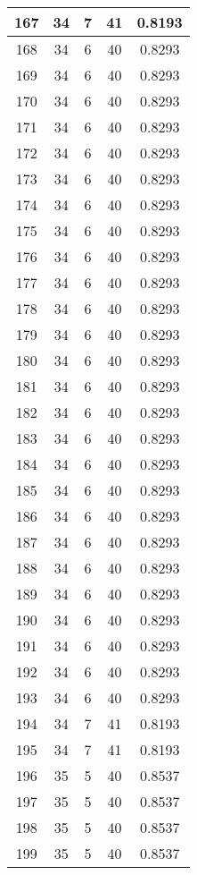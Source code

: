 \documentclass[letterpaper, 12pt]{article}
\begin{document}
\begin{longtable}{|c|c|c|c|c|}
\hline
167 & 34 & 7 & 41 & 0.8193 \\
\hline
168 & 34 & 6 & 40 & 0.8293 \\
\hline
169 & 34 & 6 & 40 & 0.8293 \\
\hline
170 & 34 & 6 & 40 & 0.8293 \\
\hline
171 & 34 & 6 & 40 & 0.8293 \\
\hline
172 & 34 & 6 & 40 & 0.8293 \\
\hline
173 & 34 & 6 & 40 & 0.8293 \\
\hline
174 & 34 & 6 & 40 & 0.8293 \\
\hline
175 & 34 & 6 & 40 & 0.8293 \\
\hline
176 & 34 & 6 & 40 & 0.8293 \\
\hline
177 & 34 & 6 & 40 & 0.8293 \\
\hline
178 & 34 & 6 & 40 & 0.8293 \\
\hline
179 & 34 & 6 & 40 & 0.8293 \\
\hline
180 & 34 & 6 & 40 & 0.8293 \\
\hline
181 & 34 & 6 & 40 & 0.8293 \\
\hline
182 & 34 & 6 & 40 & 0.8293 \\
\hline
183 & 34 & 6 & 40 & 0.8293 \\
\hline
184 & 34 & 6 & 40 & 0.8293 \\
\hline
185 & 34 & 6 & 40 & 0.8293 \\
\hline
186 & 34 & 6 & 40 & 0.8293 \\
\hline
187 & 34 & 6 & 40 & 0.8293 \\
\hline
188 & 34 & 6 & 40 & 0.8293 \\
\hline
189 & 34 & 6 & 40 & 0.8293 \\
\hline
190 & 34 & 6 & 40 & 0.8293 \\
\hline
191 & 34 & 6 & 40 & 0.8293 \\
\hline
192 & 34 & 6 & 40 & 0.8293 \\
\hline
193 & 34 & 6 & 40 & 0.8293 \\
\hline
194 & 34 & 7 & 41 & 0.8193 \\
\hline
195 & 34 & 7 & 41 & 0.8193 \\
\hline
196 & 35 & 5 & 40 & 0.8537 \\
\hline
197 & 35 & 5 & 40 & 0.8537 \\
\hline
198 & 35 & 5 & 40 & 0.8537 \\
\hline
199 & 35 & 5 & 40 & 0.8537 \\
\hline
\end{longtable}
\end{document}
